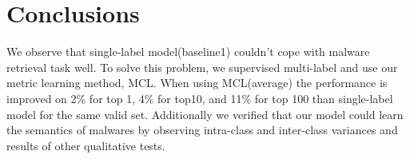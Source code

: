 \section{Conclusions}


We observe that single-label model(baseline1) couldn't cope with malware retrieval task well. 
To solve this problem, we supervised multi-label and use our metric learning method, MCL. 
When using MCL(average) the performance is improved on 2\% for top 1, 4\% for top10, and 11\% for top 100 than single-label model for the same valid set. 
Additionally we verified that our model could learn the semantics of malwares by observing intra-class and inter-class variances and results of other qualitative tests.




\appendix


\begin{acks}
\end{acks}
